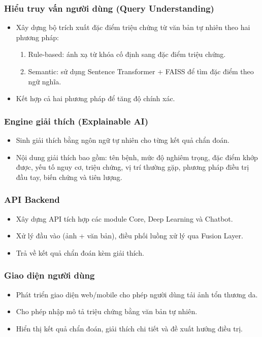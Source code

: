 \documentclass[12pt,a4paper]{article}
\begin{document}
\subsubsection{Hiểu truy vấn người dùng (Query Understanding)}
\begin{itemize}
    \item Xây dựng bộ trích xuất đặc điểm triệu chứng từ văn bản tự nhiên theo hai phương pháp:
    \begin{enumerate}
        \item Rule-based: ánh xạ từ khóa cố định sang đặc điểm triệu chứng.
        \item Semantic: sử dụng Sentence Transformer + FAISS để tìm đặc điểm theo ngữ nghĩa.
    \end{enumerate}
    \item Kết hợp cả hai phương pháp để tăng độ chính xác.
\end{itemize}

\subsubsection{Engine giải thích (Explainable AI)}
\begin{itemize}
    \item Sinh giải thích bằng ngôn ngữ tự nhiên cho từng kết quả chẩn đoán.
    \item Nội dung giải thích bao gồm: tên bệnh, mức độ nghiêm trọng, đặc điểm khớp được, yếu tố nguy cơ, triệu chứng, vị trí thường gặp, phương pháp điều trị đầu tay, biến chứng và tiên lượng.
\end{itemize}

\subsubsection{API Backend}
\begin{itemize}
    \item Xây dựng API tích hợp các module Core, Deep Learning và Chatbot.
    \item Xử lý đầu vào (ảnh + văn bản), điều phối luồng xử lý qua Fusion Layer.
    \item Trả về kết quả chẩn đoán kèm giải thích.
\end{itemize}

\subsubsection{Giao diện người dùng}
\begin{itemize}
    \item Phát triển giao diện web/mobile cho phép người dùng tải ảnh tổn thương da.
    \item Cho phép nhập mô tả triệu chứng bằng văn bản tự nhiên.
    \item Hiển thị kết quả chẩn đoán, giải thích chi tiết và đề xuất hướng điều trị.
\end{itemize}
\end{document}

